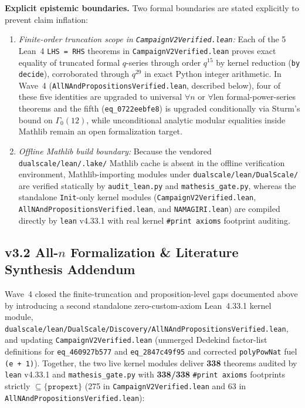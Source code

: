 \noindent\textbf{Explicit epistemic boundaries.}
Two formal boundaries are stated explicitly to prevent claim inflation:
\begin{enumerate}
  \item \emph{Finite-order truncation scope in \texttt{CampaignV2Verified.lean}:} Each of the 5 Lean~4
    \texttt{LHS = RHS} theorems in \texttt{CampaignV2Verified.lean} proves
    exact equality of truncated formal $q$-series through order $q^{15}$ by
    kernel reduction (\texttt{by decide}), corroborated through $q^{29}$ in
    exact Python integer arithmetic. In Wave~4 (\texttt{AllNAndPropositionsVerified.lean}, described below),
    four of these five identities are upgraded to universal $\forall n$ or $\forall \text{len}$
    formal-power-series theorems and the fifth (\texttt{eq\_0722eebfe8}) is upgraded
    conditionally via Sturm's bound on $\Gamma_0(12)$, while unconditional analytic
    modular equalities inside Mathlib remain an open formalization target.
  \item \emph{Offline Mathlib build boundary:} Because the vendored
    \texttt{dualscale/lean/.lake/} Mathlib cache is absent in the offline
    verification environment, Mathlib-importing modules under
    \texttt{dualscale/lean/DualScale/} are verified statically by
    \texttt{audit\_lean.py} and \texttt{mathesis\_gate.py}, whereas the
    standalone \texttt{Init}-only kernel modules
    (\texttt{CampaignV2Verified.lean}, \texttt{AllNAndPropositionsVerified.lean},
    and \texttt{NAMAGIRI.lean}) are
    compiled directly by \texttt{lean} v4.33.1 with real kernel
    \texttt{\#print axioms} footprint auditing.
\end{enumerate}

\subsection*{v3.2 All-$n$ Formalization \& Literature Synthesis Addendum}

Wave~4 closed the finite-truncation and proposition-level gaps documented above by introducing a second standalone zero-custom-axiom Lean~4.33.1 kernel module, \texttt{dualscale/lean/DualScale/Discovery/AllNAndPropositionsVerified.lean}, and updating \texttt{CampaignV2Verified.lean} (unmerged Dedekind factor-list definitions for \texttt{eq\_460927b577} and \texttt{eq\_2847c49f95} and corrected \texttt{polyPowNat} fuel \texttt{(e + 1)}). Together, the two live kernel modules deliver \textbf{338} theorems audited by \texttt{lean} v4.33.1 and \texttt{mathesis\_gate.py} with \textbf{338/338} \texttt{\#print axioms} footprints strictly $\subseteq \{\texttt{propext}\}$ (275 in \texttt{CampaignV2Verified.lean} and 63 in \texttt{AllNAndPropositionsVerified.lean}):

